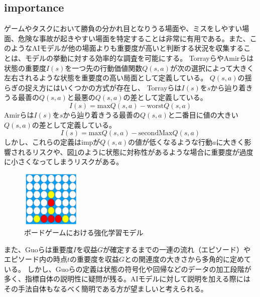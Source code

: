 \subsection{importance}
ゲームやタスクにおいて勝負の分かれ目となりうる場面や、ミスをしやすい場面、危険な事故が起きやすい場面を特定することは非常に有用である。また、このようなAIモデルが他の場面よりも重要度が高いと判断する状況を収集することは、モデルの挙動に対する効率的な調査を可能にする。
Torrayら\cite{imp2013}やAmirら\cite{imp2016}は状態の重要度$I(s)$を一つ先の行動価値関数$Q(s, a)$が次の選択によって大きく左右されるような状態を重要度の高い局面として定義している。
$Q(s, a)$の揺らぎの捉え方にはいくつかの方式が存在し、
Torrayらは$I(s)$を$s$から辿り着きうる最善の$Q(s, a)$と最悪の$Q(s, a)$の差として定義している。
\begin{equation}
	{I(s)= \textrm{max}Q(s, a)-\textrm{worst}Q(s, a)}
\end{equation}
Amirらは$I(s)$を$s$から辿り着きうる最善の$Q(s, a)$と二番目に値の大きい$Q(s, a)$の差として定義している。
\begin{equation}
    \label{imp}
	{I(s)= \textrm{max}Q(s, a)-\textrm{secondMax}Q(s, a)}
\end{equation}
しかし、これらの定義はimpが$Q(s, a)$の値が低くなるような行動$a$に大きく影響されるリスクや、図\ref{fig:symmetry}のように状態に対称性があるような場合に重要度が過度に小さくなってしまうリスクがある。
\begin{figure}[t]
	\centering
	\includegraphics[width=80pt]{./figure/symmetry.png}
	\caption{ボードゲームにおける強化学習モデル}
	\label{fig:symmetry}
\end{figure}
また、Guoら\cite{EDGE}は重要度$I$を収益$G$が確定するまでの一連の流れ（エピソード）やエピソード内の時点$t$の重要度を収益$G$との関連度の大きさから多角的に定めている。
しかし、Guoらの定義は状態の符号化や回帰などのデータの加工段階が多く、指標自体の説明性に疑問が残る。AIモデルに対して説明を加える際にはその手法自体もなるべく簡明である方が望ましいと考えられる。





